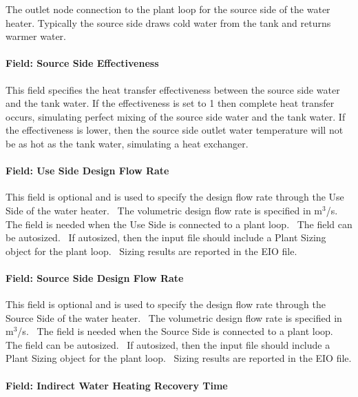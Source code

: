 The outlet node connection to the plant loop for the source side of the water heater. Typically the source side draws cold water from the tank and returns warmer water.

\paragraph{Field: Source Side Effectiveness}\label{field-source-side-effectiveness}

This field specifies the heat transfer effectiveness between the source side water and the tank water. If the effectiveness is set to 1 then complete heat transfer occurs, simulating perfect mixing of the source side water and the tank water. If the effectiveness is lower, then the source side outlet water temperature will not be as hot as the tank water, simulating a heat exchanger.

\paragraph{Field: Use Side Design Flow Rate}\label{field-use-side-design-flow-rate-000}

This field is optional and is used to specify the design flow rate through the Use Side of the water heater.~ The volumetric design flow rate is specified in m\(^{3}\)/s.~ The field is needed when the Use Side is connected to a plant loop.~ The field can be autosized.~ If autosized, then the input file should include a Plant Sizing object for the plant loop.~ Sizing results are reported in the EIO file.

\paragraph{Field: Source Side Design Flow Rate}\label{field-source-side-design-flow-rate-000}

This field is optional and is used to specify the design flow rate through the Source Side of the water heater.~ The volumetric design flow rate is specified in m\(^{3}\)/s.~ The field is needed when the Source Side is connected to a plant loop.~ The field can be autosized.~ If autosized, then the input file should include a Plant Sizing object for the plant loop.~ Sizing results are reported in the EIO file.

\paragraph{Field: Indirect Water Heating Recovery Time}\label{field-indirect-water-heating-recovery-time}


